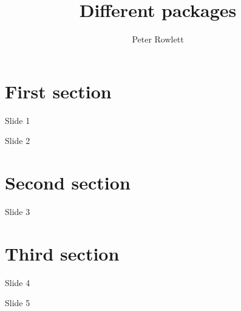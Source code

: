 \documentclass{beamer}
\title{Different packages}
\author{Peter Rowlett}
\begin{document}
	
	\begin{frame}[plain]
		\titlepage
	\end{frame}
		
	\section{First section}
	
	\begin{frame}{Slide 1}
	\end{frame}
	
	\begin{frame}{Slide 2}
	\end{frame}
	
	\section{Second section}
	
	\begin{frame}{Slide 3}
	\end{frame}
	
	\section{Third section}
	
	\begin{frame}{Slide 4}
	\end{frame}
	
	\begin{frame}{Slide 5}
	\end{frame}
\end{document}
